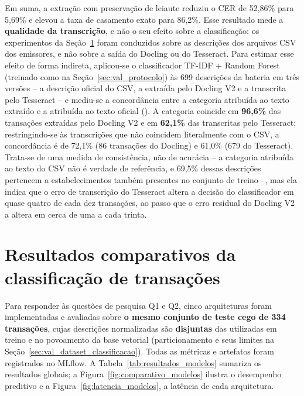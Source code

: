 Em suma, a extração com preservação de leiaute reduziu o CER de 52,86\% para 5,69\% e elevou a taxa de casamento exato para 86,2\%. Esse resultado mede a \textbf{qualidade da transcrição}, e não o seu efeito sobre a classificação: os experimentos da Seção~\ref{sec:val_resultados_classificacao} foram conduzidos sobre as descrições dos arquivos CSV dos emissores, e não sobre a saída do Docling ou do Tesseract. Para estimar esse efeito de forma indireta, aplicou-se o classificador TF-IDF + Random Forest (treinado como na Seção~\ref{sec:val_protocolo}) às 699 descrições da bateria em três versões -- a descrição oficial do CSV, a extraída pelo Docling V2 e a transcrita pelo Tesseract -- e mediu-se a concordância entre a categoria atribuída ao texto extraído e a atribuída ao texto oficial (). A categoria coincide em \textbf{96,6\%} das transações extraídas pelo Docling V2 e em \textbf{62,1\%} das transcritas pelo Tesseract; restringindo-se às transcrições que não coincidem literalmente com o CSV, a concordância é de 72,1\% (86 transações do Docling) e 61,0\% (679 do Tesseract). Trata-se de uma medida de consistência, não de acurácia -- a categoria atribuída ao texto do CSV não é verdade de referência, e 69,5\% dessas descrições pertencem a estabelecimentos também presentes no conjunto de treino --, mas ela indica que o erro de transcrição do Tesseract altera a decisão do classificador em quase quatro de cada dez transações, ao passo que o erro residual do Docling V2 a altera em cerca de uma a cada trinta.

\section{Resultados comparativos da classificação de transações}
\label{sec:val_resultados_classificacao}

Para responder às questões de pesquisa Q1 e Q2, cinco arquiteturas foram implementadas e
avaliadas sobre \textbf{o mesmo conjunto de teste cego de 334 transações}, cujas
descrições normalizadas são \textbf{disjuntas} das utilizadas em treino e no povoamento da base
vetorial (particionamento e seus limites na Seção~\ref{sec:val_dataset_classificacao}). Todas as
métricas e artefatos foram registrados no MLflow. A Tabela~\ref{tab:resultados_modelos}
sumariza os resultados globais; a Figura~\ref{fig:comparativo_modelos} ilustra o desempenho preditivo e a Figura~\ref{fig:latencia_modelos}, a latência de cada arquitetura.

